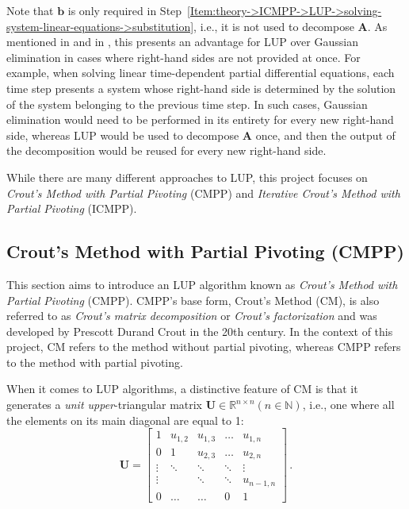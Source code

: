 Note that $\mathbf{b}$ is only required in Step~\ref{Item:theory->ICMPP->LUP->solving-system-linear-equations->substitution}, i.e., it is not used to decompose $\mathbf{A}$.
As mentioned in  \cite{Cejka2022} and in  \cite{Lindfield2019}, this presents an advantage for LUP over Gaussian elimination in cases where right-hand sides are not provided at once.
For example, when solving linear time-dependent partial differential equations, each time step presents a system whose right-hand side is determined by the solution of the system belonging to the previous time step.
In such cases, Gaussian elimination would need to be performed in its entirety for every new right-hand side, whereas LUP would be used to decompose $\mathbf{A}$ once, and then the output of the decomposition would be reused for every new right-hand side.

While there are many different approaches to LUP, this project focuses on \textit{Crout's Method with Partial Pivoting} (CMPP) and \textit{Iterative Crout's Method with Partial Pivoting} (ICMPP).



\subsection{Crout's Method with Partial Pivoting (CMPP)}\label{Subsection:theory->ICMPP->LUP->CMPP}
This section aims to introduce an LUP algorithm known as \textit{Crout's Method with Partial Pivoting} (CMPP).
CMPP's base form, Crout's Method (CM), is also referred to as \textit{Crout's matrix decomposition} or \textit{Crout's factorization} and was developed by Prescott Durand Crout \cite{Press2007} in the 20th century.
In the context of this project, CM refers to the method without partial pivoting, whereas CMPP refers to the method with partial pivoting.

When it comes to LUP algorithms, a distinctive feature of CM is that it generates a \textit{unit upper}-triangular matrix $\mathbf{U} \in \mathbb{R}^{n \times n} \left(n \in \mathbb{N}\right)$, i.e., one where all the elements on its main diagonal are equal to 1:
\begin{equation}
	\mathbf{U} = {
		\begin{bmatrix}
			1		 & u _{1,2} & u _{1,3} & \ldots & u _{1,n}   \\
			0 		 & 1		& u _{2,3} & \ldots & u _{2,n}   \\
			\vdots   & \ddots 	& \ddots   & \ddots & \vdots 	 \\
			\vdots   & 			& \ddots   & \ddots & u _{n-1,n} \\
			0 		 & \ldots	& \ldots   & 0 		& 1
		\end{bmatrix}
	} \,.
\end{equation}

